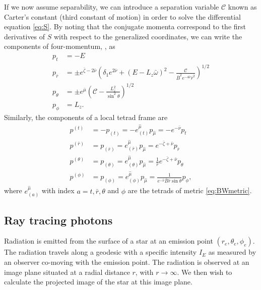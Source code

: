 \documentclass[iop, usenatbib]{emulateapj}
\makeatletter
\def\fvec#1{\underline{\sbox\tw@{$#1$}\dp\tw@\z@\box\tw@}}
\newcommand{\Ca}{\ensuremath{\mathcal{C}}}
\newcommand{\rb}{\ensuremath{\bar{r}}}
\newcommand{\wb}{\ensuremath{\bar{\omega}}}
\newcommand{\nub}{\ensuremath{\bar{\nu}}}
\newcommand{\zetab}{\ensuremath{\bar{\zeta}}}
\newcommand{\Bb}{\ensuremath{\bar{B}}}
\newcommand{\mub}{\ensuremath{\bar{\mu}}}
\makeatother
\begin{document}
If we now assume separability, we can introduce a separation variable $\Ca$ known as Carter's constant (third constant of motion) in order to solve the differential equation \eqref{eq:S}.  
By noting that the conjugate momenta correspond to the first derivatives of $S$ with respect to the generalized coordinates, we can write the components of four-momentum, \fvec{p}, as 
\begin{align}
  p_t        &= -E \label{eq:p_t}\\
  p_{\rb}    &= \pm e^{\zetab - 2\nub} \left( \delta_1 e^{2\nub} + (E - L_z \wb)^2 - \frac{\Ca}{\Bb^2 e^{-4\nub} \rb^2} \right)^{1/2}\label{eq:p_r}\\
  p_{\theta} &= \pm e^{\mub} \left( \Ca - \frac{L_z^2}{\sin^2\theta} \right)^{1/2}\label{eq:p_the}\\
  p_{\phi}   &= L_z\label{eq:p_p}.
\end{align}
Similarly, the components of a local tetrad frame are
\begin{align}
  p^{(t)} &= -p_{(t)} = -e_{(t)}^{\hat{\mu}} p_{\hat{\mu}} = -e^{-\nub}p_t \label{eq:tetp_t}\\
  p^{(\rb)} &= p_{(\rb)} = e_{(\rb)}^{\hat{\mu}} p_{\hat{\mu}} = e^{-\zetab + \nub} p_{\rb} \label{eq:tetp_r}\\
  p^{(\theta)} &= p_{(\theta)} = e_{(\theta)}^{\hat{\mu}} p_{\hat{\mu}} = \frac{1}{\rb} e^{-\zetab+\nub} p_{\theta} \label{eq:tetp_theta}\\
  p^{(\phi)} &= p_{(\phi)} = e_{(\phi)}^{\hat{\mu}} p_{\hat{\mu}} = \frac{1}{e^{-\nub} \Bb \rb \sin\theta} p_{\phi} \label{eq:tetp_phi},
\end{align}
where $e^{\hat{\mu}}_{(a)}$ with index $a = t, \rb, \theta$ and $\phi$ are the tetrads of metric \eqref{eq:BWmetric}.


\subsection{Ray tracing photons}\label{sect:raytracing}
Radiation is emitted from the surface of a star at an emission point $(r_e,\theta_e,\phi_e)$.  
The radiation travels along a geodesic with a specific intensity $I_{E}$ as measured by an observer co-moving with the emission point.  
The radiation is observed at an image plane situated at a radial distance $r$, with $r\rightarrow\infty$.  
We then wish to calculate the projected image of the star at this image plane.
\end{document}
